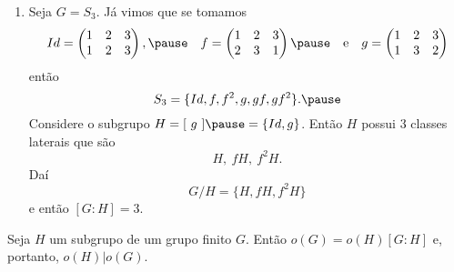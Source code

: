 \documentclass{beamer}
\begin{document}
    \begin{frame}
        \begin{exemplos}
            \begin{enumerate}[label=({\arabic*})]
                \conti

                \item Seja $G = S_3$. \pause J\'a vimos que se tomamos
                \[
                    Id = \begin{pmatrix}
                        1 & 2 & 3\\
                        1 & 2 & 3
                    \end{pmatrix}, \pause\quad
                    f = \begin{pmatrix}
                        1 & 2 & 3\\
                        2 & 3 & 1
                    \end{pmatrix} \pause \quad \mbox{e}\quad
                    g = \begin{pmatrix}
                        1 & 2 & 3\\
                        1 & 3 & 2
                    \end{pmatrix}
                \]
                ent\~ao
                \[
                    S_3 = \{Id, f, f^2, g, gf, gf^2\}. \pause
                \]
                Considere o subgrupo $H = [\ g\ ] \pause = \{Id, g\}$. Então $H$ possui 3 classes laterais que são
                \[
                    H,\ fH,\ f^2H. 
                \]
                Daí
                \[
                    G/H = \{H, fH, f^2H\}
                \]
                e então $[G : H] = 3$.
            \end{enumerate}
        \end{exemplos}
    \end{frame}

    \begin{frame}
        \begin{teorema}
            Seja $H$ um subgrupo de um grupo finito $G$. Então $o(G) = o(H)[G:H]$ e, portanto, $o(H) | o(G)$.
        \end{teorema}
    \end{frame}
\end{document}
